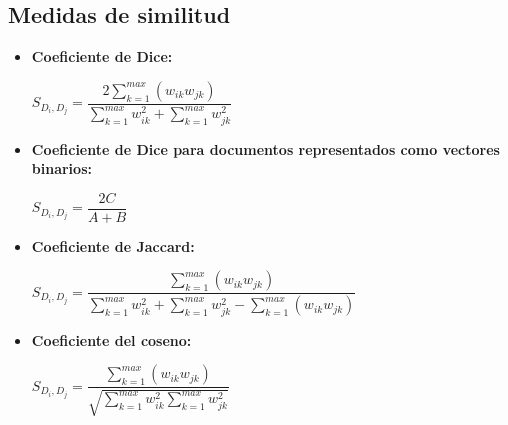 \documentclass{llncs}
\begin{document}
\subsection{Medidas de similitud}
\begin{itemize}
	\item \textbf{Coeficiente de Dice:}
	\begin{center}
		$ S_{D_{i}, D_{j}} = \dfrac{2 \sum_{k=1}^{max} (w_{ik}w_{jk})}{\sum_{k=1}^{max}w_{ik}^{2} + \sum_{k=1}^{max}w_{jk}^{2}} $
	\end{center}
	\item \textbf{Coeficiente de Dice para documentos representados como vectores binarios:}
	\begin{center}
		$ S_{D_{i}, D_{j}} = \dfrac{2C}{A+B} $
	\end{center}
	\item \textbf{Coeficiente de Jaccard:}
	\begin{center}
		$ S_{D_{i}, D_{j}} = \dfrac{\sum_{k=1}^{max} (w_{ik}w_{jk})}{\sum_{k=1}^{max}w_{ik}^{2} + \sum_{k=1}^{max}w_{jk}^{2} - \sum_{k=1}^{max} (w_{ik}w_{jk})} $
	\end{center}
	\item \textbf{Coeficiente del coseno:}
	\begin{center}
		$ S_{D_{i}, D_{j}} = \dfrac{\sum_{k=1}^{max} (w_{ik}w_{jk})}{\sqrt{\sum_{k=1}^{max}w_{ik}^{2} \sum_{k=1}^{max}w_{jk}^{2}}} $
	\end{center}
\end{itemize}
\end{document}
